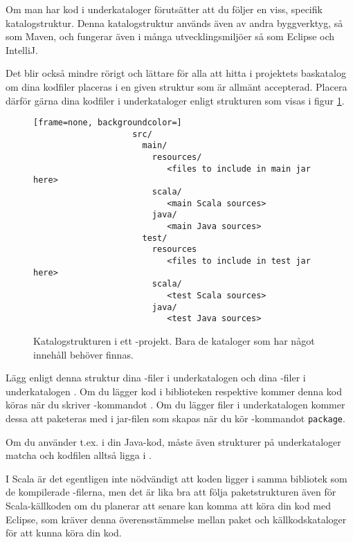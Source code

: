 Om man har kod i underkataloger förutsätter \sbt att du följer en viss, specifik katalogstruktur. Denna katalogstruktur används även av andra byggverktyg, så som Maven, och fungerar även i många utvecklingsmiljöer så som Eclipse och IntelliJ. 

Det blir också mindre rörigt och lättare för alla att hitta i projektets baskatalog om dina kodfiler placeras i en given struktur som är allmänt accepterad.
Placera därför gärna dina kodfiler i underkataloger enligt strukturen som visas i figur \ref{fig:sbt:dir-structure}. 

\begin{figure}[H]
\centering

\begin{lstlisting}[frame=none, backgroundcolor=]
					src/
					  main/
					    resources/
					       <files to include in main jar here>
					    scala/
					       <main Scala sources>
					    java/
					       <main Java sources>
					  test/
					    resources
					       <files to include in test jar here>
					    scala/
					       <test Scala sources>
					    java/
					       <test Java sources>
\end{lstlisting}

\caption{Katalogstrukturen i ett \sbt-projekt. Bara de kataloger som har något innehåll behöver finnas.}
\label{fig:sbt:dir-structure}
\end{figure}

\noindent Lägg enligt denna struktur dina -filer i underkatalogen  och dina -filer i underkatalogen . Om du lägger kod i biblioteken   respektive  kommer denna kod köras när du skriver \sbt-kommandot . Om du lägger filer i underkatalogen  kommer dessa att paketeras med i jar-filen som skapas när du kör \sbt-kommandot \texttt{package}.

Om du använder t.ex.  i din Java-kod, måste även strukturer på underkataloger matcha och kodfilen alltså ligga i  .

I Scala är det egentligen inte nödvändigt att koden ligger i samma bibliotek som de kompilerade -filerna, men det är lika bra att följa paketstrukturen även för Scala-källkoden om du planerar att senare kan komma att köra din kod med Eclipse, som kräver denna överensstämmelse mellan paket och källkodskataloger för att kunna köra din kod.



